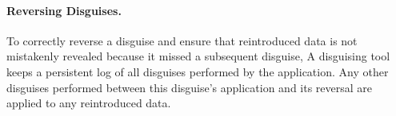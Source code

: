 \paragraph{Reversing Disguises.}
To correctly reverse a disguise and ensure that reintroduced data is not mistakenly revealed because
it missed a subsequent disguise, A disguising tool keeps a persistent log of all disguises performed by the
application. Any other disguises performed between this disguise's application and its reversal are 
applied to any reintroduced data.
